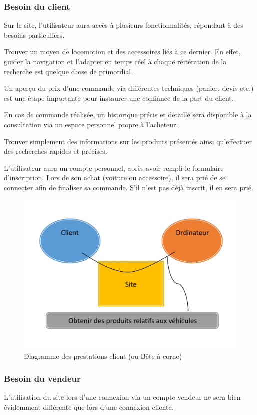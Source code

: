 \documentclass[a4paper]{article}
\begin{document}
		\subsubsection{Besoin du client}
	Sur le site, l'utilisateur aura accès à plusieurs fonctionnalités, répondant à des besoins particuliers.
	
	Trouver un moyen de locomotion et des accessoires liés à ce dernier.
	En effet, guider la navigation et l'adapter en temps réel à chaque réitération de la recherche est quelque chose de primordial. 
	
	Un aperçu du prix d'une commande via différentes techniques (panier, devis etc.) est une étape importante pour instaurer une confiance de la part du client.
	
	En cas de commande réalisée, un historique précis et détaillé sera disponible à la consultation via un espace personnel propre à l'acheteur.
	
	Trouver simplement des informations sur les produits présentés ainsi qu'effectuer des recherches rapides et précises. 
	
	L'utilisateur aura un compte personnel, après avoir rempli le formulaire d'inscription. Lors de son achat (voiture ou accessoire), il sera prié de se connecter afin de finaliser sa commande. S'il n'est pas déjà inscrit, il en sera prié.
	
		\begin{figure}[t]
		\centering
			\includegraphics[scale=0.5]{../graph/beteACorne1.jpg}
			\caption{Diagramme des prestations client (ou Bête à corne)}
	\end{figure}
		\newpage
		\subsubsection{Besoin du vendeur}
		L'utilisation du site lors d'une connexion via un compte vendeur ne sera bien évidemment différente que lors d'une connexion cliente.
		
\end{document}
